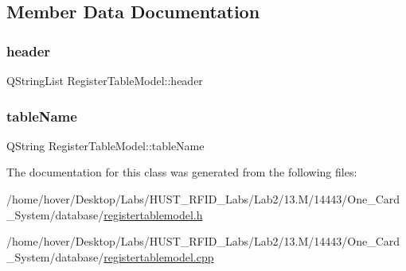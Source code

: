 \subsection{Member Data Documentation}
\mbox{\label{class_register_table_model_a90768a3ec3a54146d4293997eecf2f0f}} 
\subsubsection{\texorpdfstring{header}{header}}
{\footnotesize\ttfamily Q\+String\+List Register\+Table\+Model\+::header\hspace{0.3cm}{\ttfamily [private]}}

\mbox{\label{class_register_table_model_acca0832c89723e301820c6c680ca60a3}} 
\subsubsection{\texorpdfstring{tableName}{tableName}}
{\footnotesize\ttfamily Q\+String Register\+Table\+Model\+::table\+Name\hspace{0.3cm}{\ttfamily [private]}}



The documentation for this class was generated from the following files\+:\begin{DoxyCompactItemize}
\item 
/home/hover/\+Desktop/\+Labs/\+H\+U\+S\+T\+\_\+\+R\+F\+I\+D\+\_\+\+Labs/\+Lab2/13.\+M/14443/\+One\+\_\+\+Card\+\_\+\+System/database/\mbox{\hyperlink{registertablemodel_8h}{registertablemodel.\+h}}\item 
/home/hover/\+Desktop/\+Labs/\+H\+U\+S\+T\+\_\+\+R\+F\+I\+D\+\_\+\+Labs/\+Lab2/13.\+M/14443/\+One\+\_\+\+Card\+\_\+\+System/database/\mbox{\hyperlink{registertablemodel_8cpp}{registertablemodel.\+cpp}}\end{DoxyCompactItemize}
